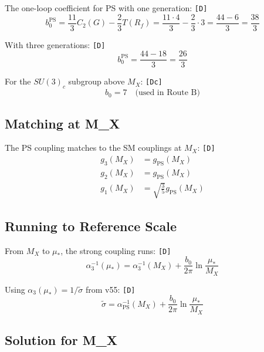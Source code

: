 \documentclass[11pt,a4paper]{article}
\newcommand{\tagD}{\textcolor{green!50!black}{\texttt{[D]}}}
\newcommand{\tagDc}{\textcolor{blue!70!black}{\texttt{[Dc]}}}
\theoremstyle{definition}
\begin{document}
The one-loop coefficient for PS with one generation: \tagD{}
\begin{equation}
\label{eq:b0-ps-calc}
b_0^{\text{PS}} = \frac{11}{3} C_2(G) - \frac{2}{3} T(R_f) = \frac{11 \cdot 4}{3} - \frac{2}{3} \cdot 3 = \frac{44 - 6}{3} = \frac{38}{3}
\end{equation}

With three generations: \tagD{}
\begin{equation}
\label{eq:b0-three-gen}
b_0^{\text{PS}} = \frac{44 - 18}{3} = \frac{26}{3}
\end{equation}

For the $SU(3)_c$ subgroup above $M_X$: \tagDc{}
\begin{equation}
\label{eq:b0-su3-above}
b_0 = 7 \quad \text{(used in Route B)}
\end{equation}

\subsection{Matching at M\_X}
\label{app:matching}

The PS coupling matches to the SM couplings at $M_X$: \tagD{}
\begin{align}
\label{eq:match-g3}
g_3(M_X) &= g_{\text{PS}}(M_X) \\
\label{eq:match-g2}
g_2(M_X) &= g_{\text{PS}}(M_X) \\
\label{eq:match-g1}
g_1(M_X) &= \sqrt{\frac{3}{5}} g_{\text{PS}}(M_X)
\end{align}

\subsection{Running to Reference Scale}
\label{app:running-reference}

From $M_X$ to $\mu_*$, the strong coupling runs: \tagD{}
\begin{equation}
\label{eq:alpha3-running}
\alpha_3^{-1}(\mu_*) = \alpha_3^{-1}(M_X) + \frac{b_0}{2\pi} \ln\frac{\mu_*}{M_X}
\end{equation}

Using $\alpha_3(\mu_*) = 1/\tilde{\sigma}$ from v55: \tagD{}
\begin{equation}
\label{eq:sigma-from-running}
\tilde{\sigma} = \alpha_{\text{PS}}^{-1}(M_X) + \frac{b_0}{2\pi} \ln\frac{\mu_*}{M_X}
\end{equation}

\subsection{Solution for M\_X}
\label{app:solution}
\end{document}
